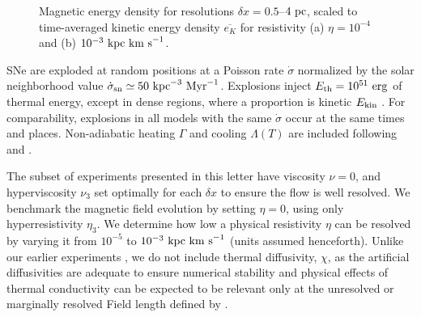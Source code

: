 \documentclass[preprint2]{aastex63}
\newcommand\SNr{\dot\sigma_{\rm sn}}
\newcommand\ESK{E_{\rm kin}}
\newcommand\EST{E_{\rm th}}
\newcommand\kpc{~ {\rm kpc}}
\newcommand\pc{~ {\rm pc}}
\newcommand\dx{ {\delta x}}
\newcommand\Myr{~ {\rm Myr}}
\newcommand\erg{~ {\rm erg}}
\newcommand\kms{~ {\rm km~ s}^{-1}}
\begin{document}
\begin{figure*}
\caption{
 Magnetic energy density for resolutions $\dx=0.5$--$4\pc$,
 scaled to time-averaged kinetic energy density $\overline{e_K}$ for resistivity
 (a) $\eta=10^{-4}$ and (b) $10^{-3}\kpc\kms$.
\label{fig:eb-res}}
\end{figure*}

 SNe are exploded at random positions at a Poisson rate $\dot\sigma$
 normalized by the solar neighborhood value $\SNr\simeq 50\kpc^{-3}\Myr^{-1}$.
 Explosions inject $\EST = 10^{51}\erg$ of thermal energy, except in
 dense regions, where a proportion is kinetic $\ESK$ 
 \citep[see][]{GMKSH20}.
 For comparability, explosions in all models with the same $\dot\sigma$ occur
 at the same times and places.
 Non-adiabatic heating $\Gamma$ and cooling $\Lambda (T)$ are included
 \citep{Gent:2013a} following \citet{Wolfire:1995} and \citet{Sarazin:1987}.

 The subset of experiments presented in this letter have viscosity $\nu=0$,
 and hyperviscosity $\nu_3$ set optimally for each $\dx$ to ensure the flow
 is well resolved.
 We benchmark the magnetic field evolution by setting $\eta=0$, using only
 hyperresistivity $\eta_3$.
 We determine how low a physical resistivity $\eta$ can be resolved by varying
 it from $10^{-5}$ to $10^{-3}\kpc\kms$ (units assumed henceforth).
 Unlike our earlier experiments \citep{Gent:2013a,Gent:2013b,GMKSH20},
 we do not include thermal diffusivity, $\chi$, as the artificial diffusivities
 are adequate to ensure numerical stability and physical effects of thermal
 conductivity can be expected to be relevant only at the unresolved or
 marginally resolved Field length defined by \citet[][named after George
 Field, not the magnetic field]{BM90}.
\end{document}
